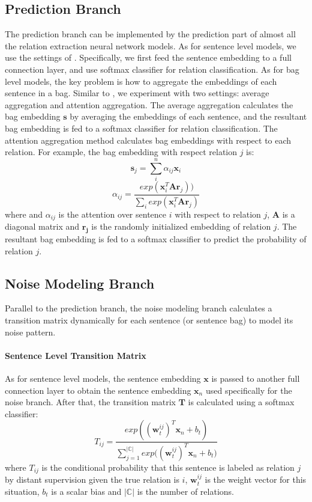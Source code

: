 \subsection{Prediction Branch}
The prediction branch can be implemented by the prediction part of almost all the relation extraction neural network models. As for sentence level models, we use the settings of \cite{luo2016temporal}. Specifically, we first feed the sentence embedding to a full connection layer, and use softmax classifier for relation classification. As for bag level models, the key problem is how to aggregate the embeddings of each sentence in a bag. Similar to \cite{lin2016neural}, we experiment with two settings: average aggregation and attention aggregation. The average aggregation calculates the bag embedding $\mathbf{s}$ by averaging the embeddings of each sentence, and the resultant bag embedding is fed to a softmax classifier for relation classification. The attention aggregation method \cite{lin2016neural} calculates bag embeddings with respect to each relation. For example, the bag embedding with respect relation $j$ is:
\begin{equation}
\mathbf{s}_j = \sum_i^{n}{\alpha_{ij} \mathbf{x}_{i}}
\end{equation}
\begin{equation}
\alpha_{ij} = \frac{exp(\mathbf{x}_{i}^T \mathbf{Ar}_j))}{\sum_{i}{exp(\mathbf{x}_{i}^T \mathbf{Ar}_j)}}
\end{equation}
where and $\alpha_{ij}$ is the attention over sentence $i$ with respect to relation $j$, $\mathbf{A}$ is a diagonal matrix and $\mathbf{r_j}$ is the randomly initialized embedding of relation $j$. The resultant bag embedding is fed to a softmax classifier to predict the probability of relation $j$.

\subsection{Noise Modeling Branch}
Parallel to the prediction branch, the noise modeling branch calculates a transition matrix dynamically for each sentence (or sentence bag) to model its noise pattern.

\paragraph{Sentence Level Transition Matrix}
As for sentence level models, the sentence embedding $\mathbf{x}$ is passed to another full connection layer to obtain the sentence embedding $\mathbf{x}_n$ used specifically for the noise branch. After that, the transition matrix $\mathbf{T}$ is calculated using a softmax classifier:
\begin{equation}
T_{ij} = \frac{exp({(\mathbf{w}_t^{ij})^T \mathbf{x}_n + b_t})}{\sum_{j=1}^{|\mathbb{C}|}{exp({(\mathbf{w}_t^{ij})^T \mathbf{x}_n + b_t}})}
\end{equation}
where $T_{ij}$ is the conditional probability that this sentence is labeled as relation $j$ by distant supervision given the true relation is $i$, $\mathbf{w}_t^{ij}$ is the weight vector for this situation, $b_t$ is a scalar bias and $|\mathbb{C}|$ is the number of relations.

